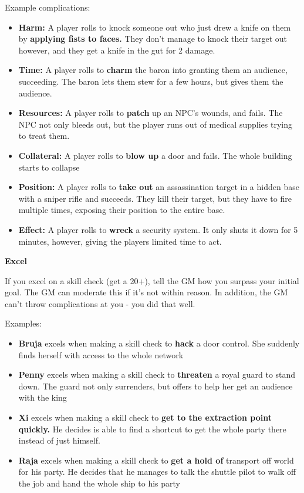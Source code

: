 Example complications:
\begin{itemize}
\item \textbf{Harm:} A player rolls to knock someone out who just drew a knife on them by \textbf{applying fists to faces.} They don’t manage to knock their target out however, and they get a knife in the gut for 2 damage.
\item \textbf{Time:} A player rolls to \textbf{charm} the baron into granting them an audience, succeeding. The baron lets them stew for a few hours, but gives them the audience.
\item \textbf{Resources:} A player rolls to \textbf{patch} up an NPC’s wounds, and fails. The NPC not only bleeds out, but the player runs out of medical supplies trying to treat them.
\item \textbf{Collateral:} A player rolls to \textbf{blow up} a door and fails. The whole building starts to collapse
\item \textbf{Position:} A player rolls to \textbf{take out} an assassination target in a hidden base with a sniper rifle and succeeds. They kill their target, but they have to fire multiple times, exposing their position to the entire base.
\item \textbf{Effect:} A player rolls to \textbf{wreck} a security system. It only shuts it down for 5 minutes, however, giving the players limited time to act.
\end{itemize}  

\begin{center}
\textbf{Excel}
\end{center}

If you excel on a skill check (get a 20+), tell the GM how you surpass your initial goal. The GM can moderate this if it’s not within reason. In addition, the GM can’t throw complications at you - you did that well. 

Examples:
\begin{itemize}
\item \textbf{Bruja} excels when making a skill check to \textbf{hack} a door control. She suddenly finds herself with access to the whole network
\item \textbf{Penny} excels when making a skill check to \textbf{threaten} a royal guard to stand down. The guard not only surrenders, but offers to help her get an audience with the king
\item \textbf{Xi} excels when making a skill check to \textbf{get to the extraction point quickly.} He decides is able to find a shortcut to get the whole party there instead of just himself.
\item \textbf{Raja} excels when making a skill check to \textbf{get a hold of} transport off world for his party. He decides that he manages to talk the shuttle pilot to walk off the job and hand the whole ship to his party
\end{itemize}  

